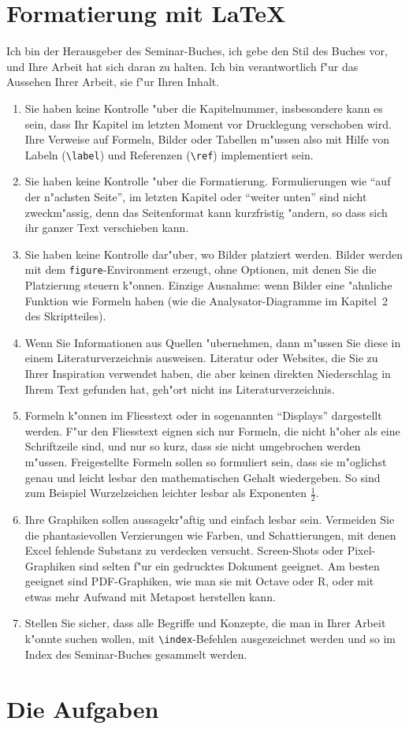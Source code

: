 \documentclass[a4paper]{article}
\begin{document}
\section{Formatierung mit \LaTeX}
Ich bin der Herausgeber des Seminar-Buches, ich gebe den Stil des
Buches vor, und Ihre Arbeit hat sich daran zu halten. 
Ich bin verantwortlich f"ur das Aussehen Ihrer Arbeit, sie f"ur Ihren
Inhalt.
\begin{enumerate}
\item
Sie haben keine Kontrolle "uber die Kapitelnummer, insbesondere
kann es sein, dass Ihr Kapitel im letzten Moment vor Drucklegung
verschoben wird.
Ihre Verweise auf Formeln, Bilder oder Tabellen m"ussen also mit Hilfe
von Labeln (\verb+\label+) und Referenzen (\verb+\ref+) implementiert
sein.
\item
Sie haben keine Kontrolle "uber die Formatierung.
Formulierungen wie ``auf der n"achsten Seite'', im letzten Kapitel
 oder ``weiter unten'' 
sind nicht zweckm"assig, denn das Seitenformat kann kurzfristig
"andern, so dass sich ihr ganzer Text verschieben kann.
\item
Sie haben keine Kontrolle dar"uber, wo Bilder platziert werden.
Bilder werden mit dem \texttt{figure}-Environment erzeugt, ohne
Optionen, mit denen Sie die Platzierung steuern k"onnen.
Einzige Ausnahme: wenn Bilder eine "ahnliche Funktion wie Formeln haben
(wie die Analysator-Diagramme im Kapitel~2 des Skriptteiles).
\item
Wenn Sie Informationen aus Quellen "ubernehmen, dann m"ussen Sie
diese in einem Literaturverzeichnis ausweisen.
Literatur oder Websites, die Sie zu Ihrer Inspiration verwendet haben,
die aber keinen direkten Niederschlag in Ihrem Text gefunden hat,
geh"ort nicht ins Literaturverzeichnis.
\item
Formeln k"onnen im Fliesstext oder in sogenannten ``Displays'' 
dargestellt werden.
F"ur den Fliesstext eignen sich nur Formeln, die nicht h"oher als
eine Schriftzeile sind, und nur so kurz, dass sie nicht umgebrochen
werden m"ussen.
Freigestellte Formeln sollen so formuliert sein, dass sie m"oglichst
genau und leicht lesbar den mathematischen Gehalt wiedergeben.
So sind zum Beispiel Wurzelzeichen leichter lesbar als Exponenten $\frac12$.
\item
Ihre Graphiken sollen aussagekr"aftig und einfach lesbar sein. 
Vermeiden Sie die phantasievollen Verzierungen wie Farben,
und Schattierungen, mit denen Excel fehlende Substanz zu verdecken
versucht.
Screen-Shots oder Pixel-Graphiken sind selten f"ur ein gedrucktes
Dokument geeignet.
Am besten geeignet sind PDF-Graphiken, wie man sie mit Octave oder
R, oder mit etwas mehr Aufwand mit Metapost herstellen kann.
\item
Stellen Sie sicher, dass alle Begriffe und Konzepte, die man in Ihrer
Arbeit k"onnte suchen wollen, mit \verb+\index+-Befehlen ausgezeichnet
werden und so im Index des Seminar-Buches gesammelt werden.
\end{enumerate}

\section{Die Aufgaben}

\end{document}

